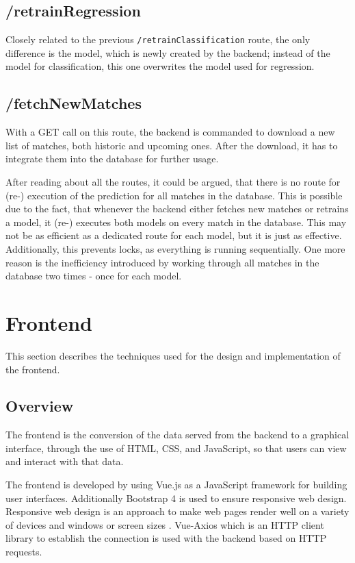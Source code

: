 \subsection{/retrainRegression}
Closely related to the previous \lstinline[columns=fixed]{/retrainClassification} route, the only difference is the model, which is newly created by the backend; instead of the model for classification, this one overwrites the model used for regression.

\subsection{/fetchNewMatches}
With a GET call on this route, the backend is commanded to download a new list of matches, both historic and upcoming ones. After the download, it has to integrate them into the database for further usage.

After reading about all the routes, it could be argued, that there is no route for (re-) execution of the prediction for all matches in the database. This is possible due to the fact, that whenever the backend either fetches new matches or retrains a model, it (re-) executes both models on every match in the database. This may not be as efficient as a dedicated route for each model, but it is just as effective. Additionally, this prevents locks, as everything is running sequentially. One more reason is the inefficiency introduced by working through all matches in the database two times - once for each model.

\section{Frontend}
This section describes the techniques used for the design and implementation of the frontend.
\subsection{Overview}
The frontend is the conversion of the data served from the backend to a graphical interface,
through the use of HTML, CSS, and JavaScript, so that users can view and interact with that data.

The frontend is developed by using Vue.js as a JavaScript framework for building user interfaces.
Additionally Bootstrap 4 is used to ensure responsive web design. Responsive web design is an approach to make web pages render well on a variety of devices and windows or screen sizes \cite{responsive:2011}. 
Vue-Axios which is an HTTP client library to establish the connection is used with the backend based on HTTP requests. 

